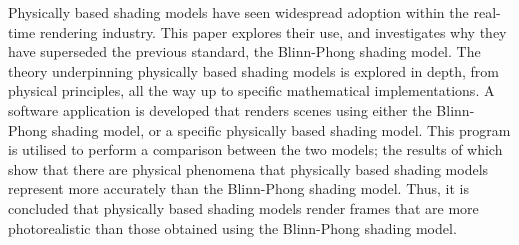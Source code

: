 \justifying

Physically based shading models have seen widespread adoption within the real-time rendering industry. This paper explores their use, and investigates why they have superseded the previous standard, the Blinn-Phong shading model. The theory underpinning physically based shading models is explored in depth, from physical principles, all the way up to specific mathematical implementations. A software application is developed that renders scenes using either the Blinn-Phong shading model, or a specific physically based shading model. This program is utilised to perform a comparison between the two models; the results of which show that there are physical phenomena that physically based shading models represent more accurately than the Blinn-Phong shading model. Thus, it is concluded that physically based shading models render frames that are more photorealistic than those obtained using the Blinn-Phong shading model.